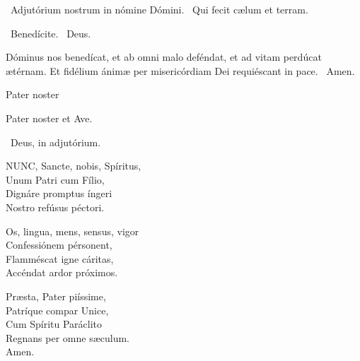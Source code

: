 \V\ Adjutórium nostrum in nómine Dómini. \R\ Qui fecit cælum et terram.

\V\ Benedícite. \R\ Deus.

 Dóminus nos benedícat, et ab omni malo deféndat, et ad vitam perdúcat ætérnam. Et fidélium ánimæ per misericórdiam Dei requiéscant in pace. \R\ Amen.

 Pater noster 


Pater noster et Ave.

\V\ Deus, in adjutórium.


\lettrine[lines=2]{N}{UNC}, Sancte, nobis, Spíritus,\\
Unum Patri cum Fílio,\\
Dignáre promptus íngeri\\
Nostro refúsus péctori.

Os, lingua, mens, sensus, vigor\\
Confessiónem pérsonent,\\
Flamméscat igne cáritas,\\
Accéndat ardor próximos.

Præsta, Pater piíssime,\\
Patríque compar Unice,\\
Cum Spíritu Paráclito\\
Regnans per omne sæculum.\\
Amen.

